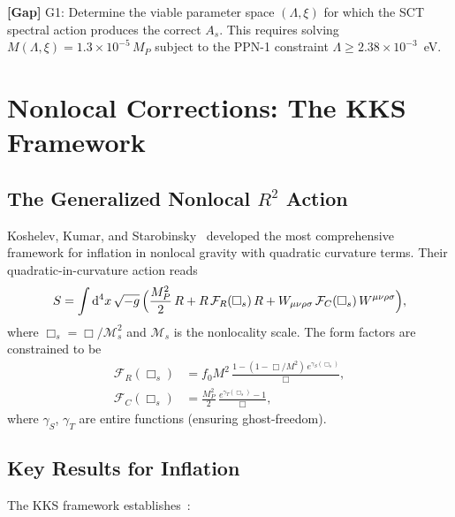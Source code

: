 \documentclass[11pt,a4paper]{article}
\renewcommand{\dd}{\mathrm{d}}
\theoremstyle{plain}
\theoremstyle{definition}
\newcommand{\gap}[1]{%
  \par\smallskip\noindent
  \colorbox{yellow!15}{\parbox{\dimexpr\linewidth-2\fboxsep}{%
    \textcolor{orange!70!black}{\textbf{[Gap]}} #1}}%
  \par\smallskip}
\begin{document}
\gap{G1: Determine the viable parameter space $(\Lambda, \xi)$ for
which the SCT spectral action produces the correct $A_s$.
This requires solving $M(\Lambda, \xi) = 1.3 \times 10^{-5}\,M_P$
subject to the PPN-1 constraint $\Lambda \geq 2.38 \times 10^{-3}$~eV.}

\section{Nonlocal Corrections: The KKS Framework}\label{sec:kks}

\subsection{The Generalized Nonlocal $R^2$ Action}

Koshelev, Kumar, and Starobinsky~\cite{KKS16,KKS17,KKS20,KKS22,KKS22b}
developed the most comprehensive framework for inflation in nonlocal
gravity with quadratic curvature terms. Their quadratic-in-curvature
action reads
\begin{equation}\label{eq:kks-action}
  S = \int \dd^4 x\,\sqrt{-g}\,
  \Bigl(\frac{M_P^2}{2}\,R + R\,\mathcal{F}_R(\Box_s)\,R
  + W_{\mu\nu\rho\sigma}\,\mathcal{F}_C(\Box_s)\,
  W^{\mu\nu\rho\sigma}\Bigr),
\end{equation}
where $\Box_s = \Box/\mathcal{M}_s^2$ and $\mathcal{M}_s$ is the
nonlocality scale. The form factors are constrained to be
\begin{align}
  \mathcal{F}_R(\Box_s) &= f_0 M^2\,
  \frac{1 - (1 - \Box/M^2)\,e^{\gamma_S(\Box_s)}}{\Box},
  \label{eq:FR}\\
  \mathcal{F}_C(\Box_s) &= \frac{M_P^2}{2}\,
  \frac{e^{\gamma_T(\Box_s)} - 1}{\Box},
  \label{eq:FC}
\end{align}
where $\gamma_S$, $\gamma_T$ are entire functions (ensuring ghost-freedom).

\subsection{Key Results for Inflation}

The KKS framework establishes~\cite{KKS16,KKS17,KKS22}:
\end{document}

